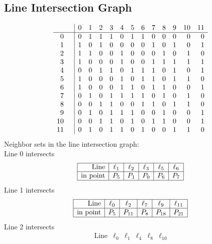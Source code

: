 \documentclass{article}
\begin{document}
{\subsection*{Line Intersection Graph}
{\arraycolsep=1pt
$$
\begin{array}{rr|*{12}r}
 &  & 0 & 1 & 2 & 3 & 4 & 5 & 6 & 7 & 8 & 9 & 10 & 11\\
\hline
0 &  & 0 & 1 & 1 & 1 & 0 & 1 & 1 & 0 & 0 & 0 & 0 & 0\\
1 &  & 1 & 0 & 1 & 0 & 0 & 0 & 0 & 1 & 0 & 1 & 0 & 1\\
2 &  & 1 & 1 & 0 & 0 & 1 & 0 & 0 & 0 & 1 & 0 & 1 & 0\\
3 &  & 1 & 0 & 0 & 0 & 1 & 0 & 0 & 1 & 1 & 1 & 1 & 1\\
4 &  & 0 & 0 & 1 & 1 & 0 & 1 & 1 & 1 & 0 & 1 & 0 & 1\\
5 &  & 1 & 0 & 0 & 0 & 1 & 0 & 1 & 1 & 0 & 1 & 1 & 0\\
6 &  & 1 & 0 & 0 & 0 & 1 & 1 & 0 & 1 & 1 & 0 & 0 & 1\\
7 &  & 0 & 1 & 0 & 1 & 1 & 1 & 1 & 0 & 1 & 0 & 1 & 0\\
8 &  & 0 & 0 & 1 & 1 & 0 & 0 & 1 & 1 & 0 & 1 & 1 & 0\\
9 &  & 0 & 1 & 0 & 1 & 1 & 1 & 0 & 0 & 1 & 0 & 0 & 1\\
10 &  & 0 & 0 & 1 & 1 & 0 & 1 & 0 & 1 & 1 & 0 & 0 & 1\\
11 &  & 0 & 1 & 0 & 1 & 1 & 0 & 1 & 0 & 0 & 1 & 1 & 0\\
\end{array}
$$
}%
Neighbor sets in the line intersection graph:\\
Line 0 intersects 
$$
\begin{array}{|r*{5}{|c}|}
\hline
\mbox{Line}  & \ell_{1} & \ell_{2} & \ell_{3} & \ell_{5} & \ell_{6}\\
\hline
\mbox{in point}  & P_{5} & P_{1} & P_{0} & P_{6} & P_{7}\\
\hline
\end{array}
$$
Line 1 intersects 
$$
\begin{array}{|r*{5}{|c}|}
\hline
\mbox{Line}  & \ell_{0} & \ell_{2} & \ell_{7} & \ell_{9} & \ell_{11}\\
\hline
\mbox{in point}  & P_{5} & P_{11} & P_{8} & P_{18} & P_{21}\\
\hline
\end{array}
$$
Line 2 intersects 
$$
\begin{array}{|r*{5}{|c}|}
\hline
\mbox{Line}  & \ell_{0} & \ell_{1} & \ell_{4} & \ell_{8} & \ell_{10}\\

\end{array}$$}
\end{document}
